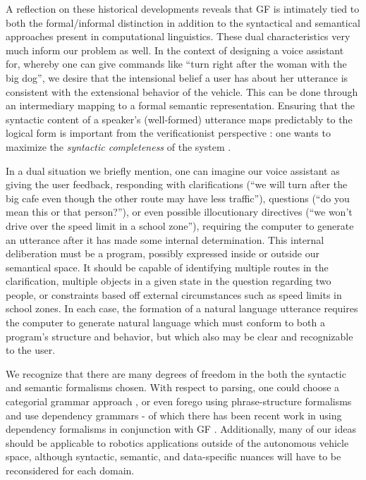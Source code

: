 \documentclass{article}
\begin{document}
A reflection on these historical developments reveals that GF is intimately tied
to both the formal/informal distinction in addition to the syntactical and
semantical approaches present in computational linguistics. These dual characteristics
very much inform our problem as well. In the context of designing a voice
assistant for, whereby one can give commands like ``turn
right after the woman with the big dog'', we desire that the intensional belief a
user has about her utterance is consistent with the extensional behavior of the
vehicle. This can be done through an intermediary mapping to a formal semantic
representation. Ensuring that the syntactic content of a speaker's
(well-formed) utterance maps predictably to the logical form is important from
the verificationist perspective : one wants to maximize the \emph{syntactic
completeness} of the system \cite{macmillan2021}.

In a dual situation we briefly mention, one can imagine our voice assistant as
giving the user feedback, responding with clarifications (``we will turn after
the big cafe even though the other route may have less traffic''), questions
(``do you mean this or that person?''), or even possible illocutionary
directives (``we won't drive over the speed limit in a school zone''), requiring
the computer to generate an utterance after it has made some internal
determination. This internal deliberation must be a program, possibly expressed
inside or outside our semantical space. It should be capable of identifying
multiple routes in the clarification, multiple objects in a given state in the
question regarding two people, or constraints based off external circumstances
such as speed limits in school zones. In each case, the formation of a natural
language utterance requires the computer to generate natural language which must
conform to both a program's structure and behavior, but which also may be clear
and recognizable to the user.

We recognize that there are many degrees of freedom in the both the syntactic
and semantic formalisms chosen. With respect to parsing, one could choose a
categorial grammar approach \cite{5152776}, or even forego using
phrase-structure formalisms and use dependency grammars - of which there has
been recent work in using dependency formalisms in conjunction with GF
\cite{ranta2017cross}. Additionally, many of our ideas should be applicable to
robotics applications outside of the autonomous vehicle space, although
syntactic, semantic, and data-specific nuances will have to be reconsidered for
each domain.
\end{document}
